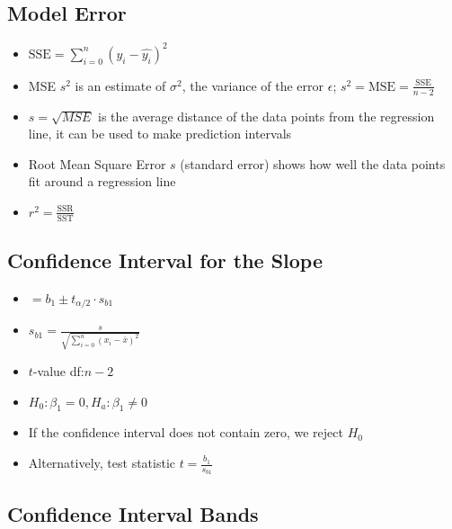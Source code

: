 \documentclass{article}
\begin{document}
\subsection{Model Error}

\begin{itemize}
    \item $\text{SSE}=\sum_{i=0}^{n}(y_i-\hat{y_i})^2$
    \item MSE $s^2$ is an estimate of $\sigma^2$, the variance of the error $\epsilon$; $s^2=\text{MSE}=\frac{\text{SSE}}{n-2}$
    \item $s=\sqrt{MSE}$ is the average distance of the data points from the regression line, it can be used to make prediction intervals
    \item Root Mean Square Error $s$ (standard error) shows how well the data points fit around a regression line
    \item $r^2=\frac{\text{SSR}}{\text{SST}}$
\end{itemize}

\subsection{Confidence Interval for the Slope}

\begin{itemize}
    \item $=b_1\pm t_{\alpha/2} \cdot s_{b1}$
    \item $s_{b1}=\frac{s}{\sqrt{\sum_{i=0}^n(x_i-\bar{x})^2}}$
    \item $t$-value df:$n-2$
    \item $H_0: \beta_1=0, H_a: \beta_1 \ne 0$
    \item If the confidence interval does not contain zero, we reject $H_0$
    \item Alternatively, test statistic $t=\frac{b_1}{s_{b1}}$
\end{itemize}

\subsection{Confidence Interval Bands}
\end{document}
